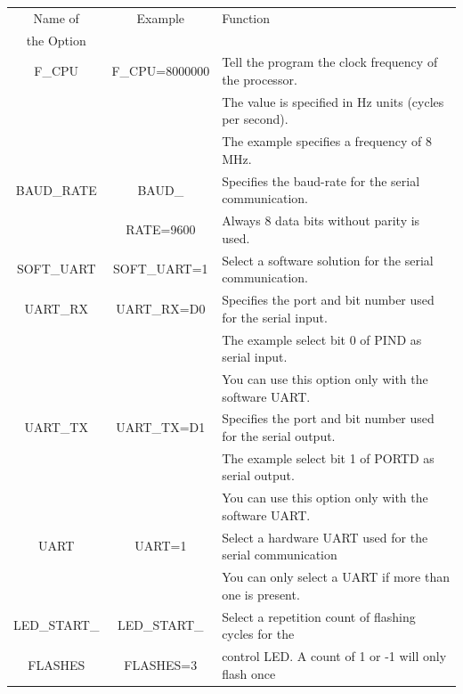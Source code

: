 \begin{table}[H]
  \begin{center}
    \begin{tabular}{| c | c | l |}
    \hline
   Name of        & Example         & Function                                            \\
   the Option         &                &                                                     \\
    \hline
    \hline
    F\_CPU         & F\_CPU=8000000 & Tell the program the clock frequency of the processor. \\
                   &                & The value is specified in Hz units (cycles per second). \\
                   &                & The example specifies a frequency of 8 MHz. \\
    \hline
    BAUD\_RATE     & BAUD\_         & Specifies the baud-rate for the serial communication. \\
                   &  RATE=9600     & Always 8 data bits without parity is used. \\
    \hline
    SOFT\_UART     & SOFT\_UART=1   & Select a software solution for the serial communication. \\
    \hline
    UART\_RX        & UART\_RX=D0   & Specifies the port and bit number used for the serial input. \\
                   &                & The example select bit 0 of PIND as serial input. \\
                   &                & You can use this option only with the software UART. \\
    \hline
    UART\_TX        & UART\_TX=D1   & Specifies the port and bit number used for the serial output. \\
                   &                & The example select bit 1 of PORTD as serial output. \\
                   &                & You can use this option only with the software UART. \\
    \hline
    UART           & UART=1         & Select a hardware UART used for the serial communication \\
                   &                & You can only select a UART if more than one is present. \\
    \hline
 LED\_START\_      & LED\_START\_   & Select a repetition count of flashing cycles for the \\
   FLASHES         &   FLASHES=3    & control LED. A count of 1 or -1 will only flash once \\

\end{tabular}
\end{center}
\end{table}
